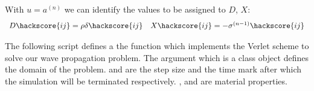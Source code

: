 With $u=a^{(n)}$ we can identify the values to be assigned to $D$, $X$:
\begin{equation}\label{WAVE  dyn 6}
\begin{array}{ll}
D\hackscore{ij}=\rho \delta\hackscore{ij}&
X\hackscore{ij}=-\sigma^{(n-1)}\hackscore{ij} \\
\end{array}
\end{equation}


 
The following script defines a the function  which
implements the Verlet scheme to solve our wave propagation problem. 
The argument  which is a \Domain class object
defines the domain of the problem.  and  are the step size
and the time mark after which the simulation will be terminated respectively. ,  and 
 are material properties. 
